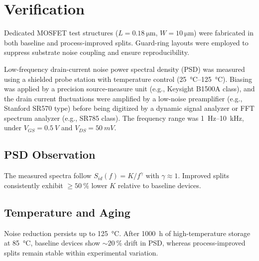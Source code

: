 \documentclass[conference]{IEEEtran}
\begin{document}
\section{Verification}
Dedicated MOSFET test structures ($L=\SI{0.18}{\micro\meter}$, $W=\SI{10}{\micro\meter}$) were fabricated in both baseline and process-improved splits. Guard-ring layouts were employed to suppress substrate noise coupling and ensure reproducibility.

Low-frequency drain-current noise power spectral density (PSD) was measured using a shielded probe station with temperature control (\SIrange{25}{125}{\celsius}). Biasing was applied by a precision source-measure unit (e.g., Keysight B1500A class), and the drain current fluctuations were amplified by a low-noise preamplifier (e.g., Stanford SR570 type) before being digitized by a dynamic signal analyzer or FFT spectrum analyzer (e.g., SR785 class). The frequency range was \SI{1}{\hertz}–\SI{10}{\kilo\hertz}, under $V_{GS}=\SI{0.5}{V}$ and $V_{DS}=\SI{50}{mV}$.

\subsection{PSD Observation}
The measured spectra follow $S_{id}(f)=K/f^{\gamma}$ with $\gamma\approx 1$. Improved splits consistently exhibit $\geq\SI{50}{\percent}$ lower $K$ relative to baseline devices.

\subsection{Temperature and Aging}
Noise reduction persists up to \SI{125}{\celsius}. After 1000~h of high-temperature storage at \SI{85}{\celsius}, baseline devices show $\sim\SI{20}{\percent}$ drift in PSD, whereas process-improved splits remain stable within experimental variation.
\end{document}
